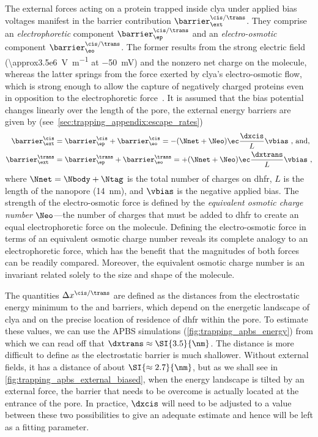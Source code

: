 The external forces acting on a protein trapped inside \gls{clya} under applied bias voltages manifest in the
barrier contribution $\barrier^{\cis/\trans}_\ext$. They comprise an \emph{electrophoretic} component
$\barrier^{\cis/\trans}_\ep$ and an \emph{electro-osmotic} component $\barrier^{\cis/\trans}_\eo$. The former
results from the strong electric field (\SI{\approx3.5e6}{\volt\per\meter} at \SI{-50}{\mV}) and the nonzero
net charge on the molecule, whereas the latter springs from the force exerted by \gls{clya}'s electro-osmotic
flow, which is strong enough to allow the capture of negatively charged proteins even in opposition to the
electrophoretic force~\cite{Soskine-2012,Soskine-2013,Soskine-Biesemans-2015,Biesemans-2015}. It is assumed
that the bias potential changes linearly over the length of the pore, the external energy barriers are given
by (see~\cref{sec:trapping_appendix:escape_rates})
%
\begin{subequations}\label{eq:external-barrier}
\begin{align}
  \barrier^{\cis}_\ext ={}&
    \barrier^{\cis}_\ep + \barrier^{\cis}_\eo =
    -(\Nnet + \Neo) \ec \dfrac{\dxcis}{L} \vbias \text{ , and,}\\
  \barrier^{\trans}_\ext ={}&
    \barrier^{\trans}_\ep + \barrier^{\trans}_\eo =
    +(\Nnet + \Neo) \ec \dfrac{\dxtrans}{L} \vbias
    \text{ ,}
\end{align}
\end{subequations}
%
where $\Nnet = \Nbody + \Ntag$ is the total number of charges on \gls{dhfr}\@, $L$ is the length of the
nanopore (\SI{14}{\nm}), and $\vbias$ is the negative applied bias.  The strength of the electro-osmotic force
is defined by the \emph{equivalent osmotic charge number} $\Neo$---the number of charges that must be added to
\gls{dhfr} to create an equal electrophoretic force on the molecule. Defining the electro-osmotic force in
terms of an equivalent osmotic charge number reveals its complete analogy to an electrophoretic force, which
has the benefit that the magnitudes of both forces can be readily compared. Moreover, the equivalent osmotic
charge number is an invariant related solely to the size and shape of the molecule.

The quantities $\Delta x^{\cis/\trans}$ are defined as the distances from the electrostatic energy minimum to
the \cisi{} and \transi{} barriers, which depend on the energetic landscape of \gls{clya} and on the precise
location of residence of \gls{dhfr} within the pore. To estimate these values, we can use the APBS simulations
(\cref{fig:trapping_apbs_energy}) from which we can read off that $\dxtrans \approx \SI{3.5}{\nm}$. The
\cisi{} distance is more difficult to define as the \cisi{} electrostatic barrier is much shallower. Without
external fields, it has a distance of about $\SI{\approx2.7}{\nm}$, but as we shall see in
\cref{fig:trapping_apbs_external_biased}, when the energy landscape is tilted by an external force, the
barrier that needs to be overcome is actually located at the \cisi{} entrance of the pore. In practice,
$\dxcis$ will need to be adjusted to a value between these two possibilities to give an adequate estimate and
hence will be left as a fitting parameter.

